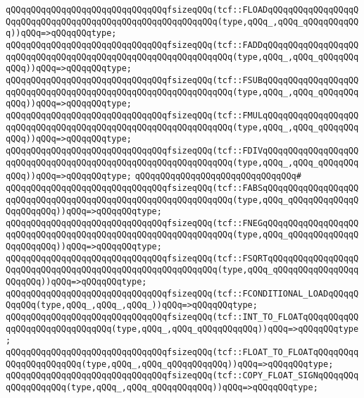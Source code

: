 \verb|qQQqqQQqqQQqqQQqqQQqqQQqqQQqqQQqfsizeqQQq(tcf::FLOADqQQqqQQqqQQqqQQqqQQqqQQqqQQqqQQqqQQqqQQqqQQqqQQqqQQqqQQqqQQq(type,qQQq_,qQQq_qQQqqQQqqQQq))qQQq=>qQQqqQQqtype;|\newline
\verb|qQQqqQQqqQQqqQQqqQQqqQQqqQQqqQQqfsizeqQQq(tcf::FADDqQQqqQQqqQQqqQQqqQQqqQQqqQQqqQQqqQQqqQQqqQQqqQQqqQQqqQQqqQQqqQQq(type,qQQq_,qQQq_qQQqqQQqqQQq))qQQq=>qQQqqQQqtype;|\newline
\verb|qQQqqQQqqQQqqQQqqQQqqQQqqQQqqQQqfsizeqQQq(tcf::FSUBqQQqqQQqqQQqqQQqqQQqqQQqqQQqqQQqqQQqqQQqqQQqqQQqqQQqqQQqqQQqqQQq(type,qQQq_,qQQq_qQQqqQQqqQQq))qQQq=>qQQqqQQqtype;|\newline
\verb|qQQqqQQqqQQqqQQqqQQqqQQqqQQqqQQqfsizeqQQq(tcf::FMULqQQqqQQqqQQqqQQqqQQqqQQqqQQqqQQqqQQqqQQqqQQqqQQqqQQqqQQqqQQqqQQq(type,qQQq_,qQQq_qQQqqQQqqQQq))qQQq=>qQQqqQQqtype;|\newline
\verb|qQQqqQQqqQQqqQQqqQQqqQQqqQQqqQQqfsizeqQQq(tcf::FDIVqQQqqQQqqQQqqQQqqQQqqQQqqQQqqQQqqQQqqQQqqQQqqQQqqQQqqQQqqQQqqQQq(type,qQQq_,qQQq_qQQqqQQqqQQq))qQQq=>qQQqqQQqtype;|\newline
\verb|qQQqqQQqqQQqqQQqqQQqqQQqqQQqqQQq#|\newline
\verb|qQQqqQQqqQQqqQQqqQQqqQQqqQQqqQQqfsizeqQQq(tcf::FABSqQQqqQQqqQQqqQQqqQQqqQQqqQQqqQQqqQQqqQQqqQQqqQQqqQQqqQQqqQQqqQQq(type,qQQq_qQQqqQQqqQQqqQQqqQQqqQQq))qQQq=>qQQqqQQqtype;|\newline
\verb|qQQqqQQqqQQqqQQqqQQqqQQqqQQqqQQqfsizeqQQq(tcf::FNEGqQQqqQQqqQQqqQQqqQQqqQQqqQQqqQQqqQQqqQQqqQQqqQQqqQQqqQQqqQQqqQQq(type,qQQq_qQQqqQQqqQQqqQQqqQQqqQQq))qQQq=>qQQqqQQqtype;|\newline
\verb|qQQqqQQqqQQqqQQqqQQqqQQqqQQqqQQqfsizeqQQq(tcf::FSQRTqQQqqQQqqQQqqQQqqQQqqQQqqQQqqQQqqQQqqQQqqQQqqQQqqQQqqQQqqQQq(type,qQQq_qQQqqQQqqQQqqQQqqQQqqQQq))qQQq=>qQQqqQQqtype;|\newline
\verb|qQQqqQQqqQQqqQQqqQQqqQQqqQQqqQQqfsizeqQQq(tcf::FCONDITIONAL_LOADqQQqqQQqqQQq(type,qQQq_,qQQq_,qQQq_))qQQq=>qQQqqQQqtype;|\newline
\verb|qQQqqQQqqQQqqQQqqQQqqQQqqQQqqQQqfsizeqQQq(tcf::INT_TO_FLOATqQQqqQQqqQQqqQQqqQQqqQQqqQQqqQQq(type,qQQq_,qQQq_qQQqqQQqqQQq))qQQq=>qQQqqQQqtype;|\newline
\verb|qQQqqQQqqQQqqQQqqQQqqQQqqQQqqQQqfsizeqQQq(tcf::FLOAT_TO_FLOATqQQqqQQqqQQqqQQqqQQqqQQq(type,qQQq_,qQQq_qQQqqQQqqQQq))qQQq=>qQQqqQQqtype;|\newline
\verb|qQQqqQQqqQQqqQQqqQQqqQQqqQQqqQQqfsizeqQQq(tcf::COPY_FLOAT_SIGNqQQqqQQqqQQqqQQqqQQq(type,qQQq_,qQQq_qQQqqQQqqQQq))qQQq=>qQQqqQQqtype;|\newline
